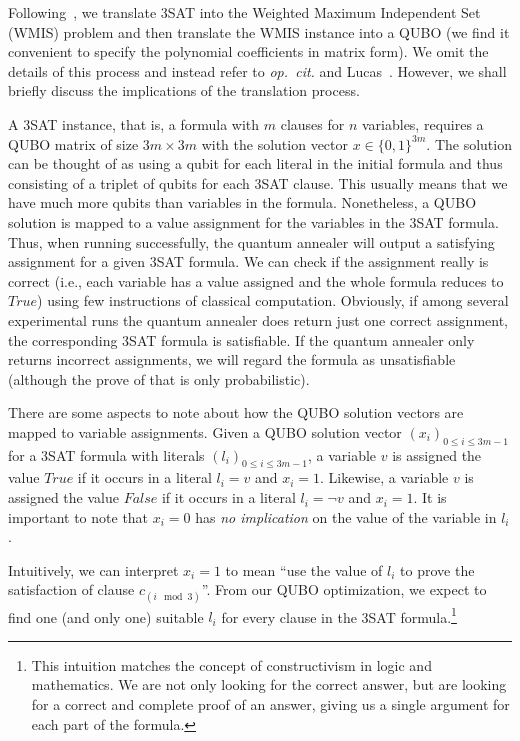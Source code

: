 Following~\cite{choi2010adiabatic,choi2011different}, we translate 3SAT into the Weighted Maximum Independent Set (WMIS) problem and then translate the WMIS instance into a QUBO (we find it convenient to specify the polynomial coefficients in matrix form). We omit the details of this process and instead refer to \emph{op.~cit.} and Lucas~\cite{lucas2014ising}. However, we shall briefly discuss the implications of the translation process.

A 3SAT instance, that is, a formula with $m$ clauses for $n$ variables,
requires a QUBO matrix of size $3m \times 3m$ with the solution vector $x \in \{0,1\}^{3m}$. The solution can be thought of as using a qubit for each literal in the initial formula and thus consisting of a triplet of qubits for each 3SAT clause. This usually means that we have much more qubits than variables in the formula. Nonetheless, a QUBO solution is mapped to a value assignment for the variables in the 3SAT formula. Thus, when running successfully, the quantum annealer will output a satisfying assignment for a given 3SAT formula. We can check if the assignment really is correct (i.e., each variable has a value assigned and the whole formula reduces to $\textit{True}$) using few instructions of classical computation. Obviously, if among several experimental runs the quantum annealer does return just one correct assignment, the corresponding 3SAT formula is satisfiable. If the quantum annealer only returns incorrect assignments, we will regard the formula as unsatisfiable (although the prove of that is only probabilistic).

There are some aspects to note about how the QUBO solution vectors are mapped to variable assignments. Given a QUBO solution vector $(x_i)_{0 \leq i \leq 3m-1}$ for a 3SAT formula with literals $(l_i)_{0 \leq i \leq 3m-1}$, a variable $v$ is assigned the value $\textit{True}$ if it occurs in a literal $l_i = v$ and $x_i = 1$. Likewise, a variable $v$ is assigned the value $\textit{False}$ if it occurs in a literal $l_i = \lnot v$ and $x_i = 1$. It is important to note that $x_i = 0$ has \emph{no implication} on the value of the variable in $l_i$.

Intuitively, we can interpret $x_i = 1$ to mean ``use the value of $l_i$ to prove the satisfaction of clause $c_{(i \mod 3)}$''. From our QUBO optimization, we expect to find one (and only one) suitable $l_i$ for every clause in the 3SAT formula.\footnote{This intuition matches the concept of constructivism in logic and mathematics. We are not only looking for the correct answer, but are looking for a correct and complete proof of an answer, giving us a single argument for each part of the formula.}

